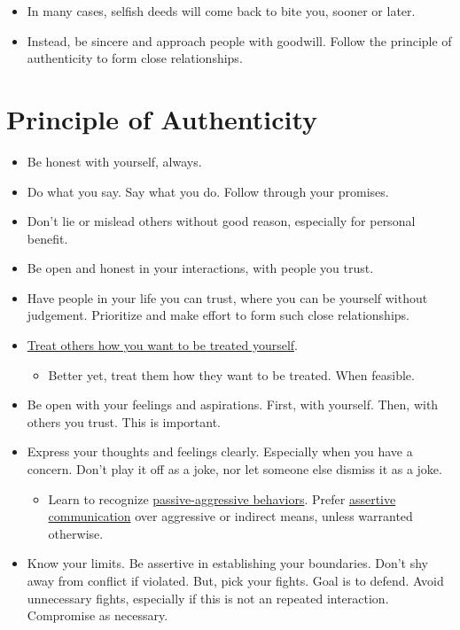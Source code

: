 \documentclass[
]{book}
\providecommand{\tightlist}{%
  \setlength{\itemsep}{0pt}\setlength{\parskip}{0pt}}
\begin{document}
\begin{itemize}
  \begin{itemize}
  \tightlist
  \item
    In many cases, selfish deeds will come back to bite you, sooner or later.
  \item
    Instead, be sincere and approach people with goodwill. Follow the principle of authenticity to form close relationships.
  \end{itemize}
\end{itemize}

\hypertarget{principle-of-authenticity}{%
\section{Principle of Authenticity}\label{principle-of-authenticity}}

\begin{itemize}
\tightlist
\item
  Be honest with yourself, always.
\item
  Do what you say. Say what you do. Follow through your promises.
\item
  Don't lie or mislead others without good reason, especially for personal benefit.
\item
  Be open and honest in your interactions, with people you trust.
\item
  Have people in your life you can trust, where you can be yourself without judgement. Prioritize and make effort to form such close relationships.
\item
  \href{https://en.wikipedia.org/wiki/Golden_Rule}{Treat others how you want to be treated yourself}.

  \begin{itemize}
  \tightlist
  \item
    Better yet, treat them how they want to be treated. When feasible.
  \end{itemize}
\item
  Be open with your feelings and aspirations. First, with yourself. Then, with others you trust. This is important.
\item
  Express your thoughts and feelings clearly. Especially when you have a concern. Don't play it off as a joke, nor let someone else dismiss it as a joke.

  \begin{itemize}
  \tightlist
  \item
    Learn to recognize \href{https://en.wikipedia.org/wiki/Passive-aggressive_behavior}{passive-aggressive behaviors}. Prefer \href{https://en.wikipedia.org/wiki/Assertiveness\#Communication}{assertive communication} over aggressive or indirect means, unless warranted otherwise.
  \end{itemize}
\item
  Know your limits. Be assertive in establishing your boundaries. Don't shy away from conflict if violated. But, pick your fights. Goal is to defend. Avoid unnecessary fights, especially if this is not an repeated interaction. Compromise as necessary.


\end{itemize}
\end{document}
